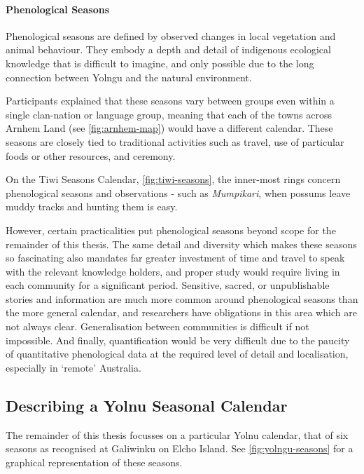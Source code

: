 \paragraph{Phenological Seasons}
Phenological seasons are defined by observed changes in local vegetation
and animal behaviour.  They embody a depth and detail of indigenous
ecological knowledge that is difficult to imagine, and only possible
due to the long connection between Yolngu and the natural environment.

Participants explained that these seasons vary between groups even within
a single clan-nation or language group, meaning that each of the towns
across Arnhem Land (see \autoref{fig:arnhem-map}) would have a different
calendar.  
%
These seasons are closely tied to traditional activities such as travel,
use of particular foods or other resources, and ceremony.

On the Tiwi Seasons Calendar, \autoref{fig:tiwi-seasons}, the inner-most
rings concern phenological seasons and observations - such as
\textit{Mumpikari}, when possums leave muddy tracks and hunting them is easy.

However, certain practicalities put phenological seasons beyond scope
for the remainder of this thesis.
%
The same detail and diversity which makes these seasons so fascinating
also mandates far greater investment of time and travel to speak
with the relevant knowledge holders, and proper study would require
living in each community for a significant period.
%
Sensitive, sacred, or unpublishable stories and information are much more
common around phenological seasons than the more general calendar,
and researchers have obligations in this area which are not always clear.
%
Generalisation between communities is difficult if not impossible.
%
And finally, quantification would be very difficult due to the paucity
of quantitative phenological data at the required level of detail
and localisation, especially in `remote' Australia.




\subsection{Describing a Yolnu Seasonal Calendar}

The remainder of this thesis focusses on a particular Yolnu calendar,
that of six seasons as recognised at Galiwinku on Elcho Island.
See \autoref{fig:yolngu-seasons} for a graphical representation of these seasons.

